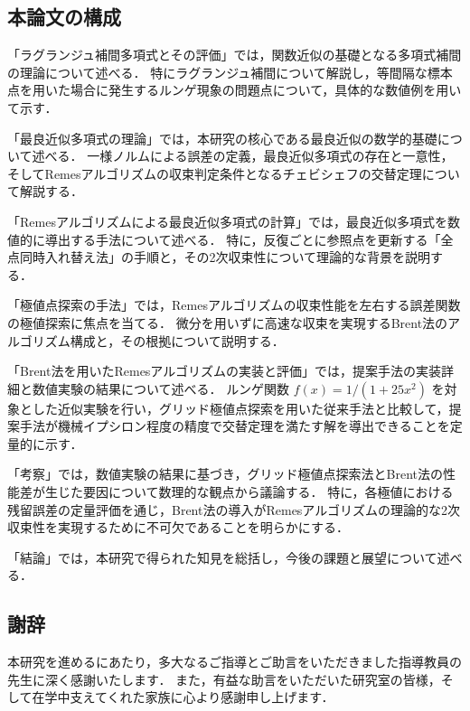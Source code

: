   \subsection*{本論文の構成}
    \begin{list}{}{
        \setlength{\leftmargin}{4.5em} %
        \setlength{\labelwidth}{4.5em} %
        \setlength{\itemindent}{0pt}   %
        \setlength{\labelsep}{0.5em}   %
        \setlength{\itemsep}{1em}      %
    }

    \item[\textbf{第1章}]
    「ラグランジュ補間多項式とその評価」では，関数近似の基礎となる多項式補間の理論について述べる．
    特にラグランジュ補間について解説し，等間隔な標本点を用いた場合に発生するルンゲ現象の問題点について，具体的な数値例を用いて示す．

    \item[\textbf{第2章}]
    「最良近似多項式の理論」では，本研究の核心である最良近似の数学的基礎について述べる．
    一様ノルムによる誤差の定義，最良近似多項式の存在と一意性，そしてRemesアルゴリズムの収束判定条件となるチェビシェフの交替定理について解説する．

    \item[\textbf{第3章}]
    「Remesアルゴリズムによる最良近似多項式の計算」では，最良近似多項式を数値的に導出する手法について述べる．
    特に，反復ごとに参照点を更新する「全点同時入れ替え法」の手順と，その2次収束性について理論的な背景を説明する．

    \item[\textbf{第4章}]
    「極値点探索の手法」では，Remesアルゴリズムの収束性能を左右する誤差関数の極値探索に焦点を当てる．
    微分を用いずに高速な収束を実現するBrent法のアルゴリズム構成と，その根拠について説明する．

    \item[\textbf{第5章}]
    「Brent法を用いたRemesアルゴリズムの実装と評価」では，提案手法の実装詳細と数値実験の結果について述べる．
    ルンゲ関数 $f(x) = 1/(1+25x^2)$ を対象とした近似実験を行い，グリッド極値点探索を用いた従来手法と比較して，提案手法が機械イプシロン程度の精度で交替定理を満たす解を導出できることを定量的に示す．

    \item[\textbf{第6章}]
    「考察」では，数値実験の結果に基づき，グリッド極値点探索法とBrent法の性能差が生じた要因について数理的な観点から議論する．
    特に，各極値における残留誤差の定量評価を通じ，Brent法の導入がRemesアルゴリズムの理論的な2次収束性を実現するために不可欠であることを明らかにする．

    \item[\textbf{第7章}]
    「結論」では，本研究で得られた知見を総括し，今後の課題と展望について述べる．
    \end{list}
  \subsection*{謝辞}
    本研究を進めるにあたり，多大なるご指導とご助言をいただきました指導教員の先生に深く感謝いたします．
    また，有益な助言をいただいた研究室の皆様，そして在学中支えてくれた家族に心より感謝申し上げます．
\newpage  %